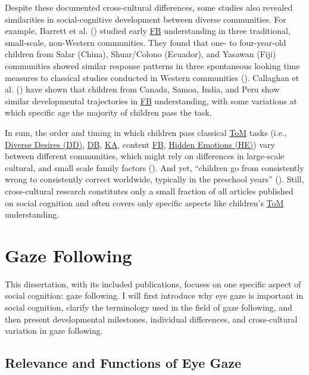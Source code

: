\documentclass[
]{scrbook}
\begin{document}
Despite these documented cross-cultural differences, some studies also revealed similarities in social-cognitive development between diverse communities. For example, Barrett et al. () studied early \hyperref[acronyms_FB]{FB} understanding in three traditional, small-scale, non-Western communities. They found that one- to four-year-old children from Salar (China), Shuar/Colono (Ecuador), and Yasawan (Fiji) communities showed similar response patterns in three spontaneous looking time measures to classical studies conducted in Western communities (). Callaghan et al. () have shown that children from Canada, Samoa, India, and Peru show similar developmental trajectories in \hyperref[acronyms_FB]{FB} understanding, with some variations at which specific age the majority of children pass the task.

In sum, the order and timing in which children pass classical \hyperref[acronyms_ToM]{ToM} tasks (i.e., \hyperref[acronyms_DD]{Diverse Desires (DD)}, \hyperref[acronyms_DB]{DB}, \hyperref[acronyms_KA]{KA}, content \hyperref[acronyms_FB]{FB}, \hyperref[acronyms_HE]{Hidden Emotions (HE)}) vary between different communities, which might rely on differences in large-scale cultural, and small scale family factors (). And yet, ``children go from consistently wrong to consistently correct worldwide, typically in the preschool years'' (). Still, cross-cultural research constitutes only a small fraction of all articles published on social cognition and often covers only specific aspects like children's \hyperref[acronyms_ToM]{ToM} understanding.

\section{Gaze Following}\label{intro-gaze}

This dissertation, with its included publications, focuses on one specific aspect of social cognition: gaze following. I will first introduce why eye gaze is important in social cognition, clarify the terminology used in the field of gaze following, and then present developmental milestones, individual differences, and cross-cultural variation in gaze following.

\subsection{Relevance and Functions of Eye Gaze}\label{relevance-and-functions-of-eye-gaze}
\end{document}
